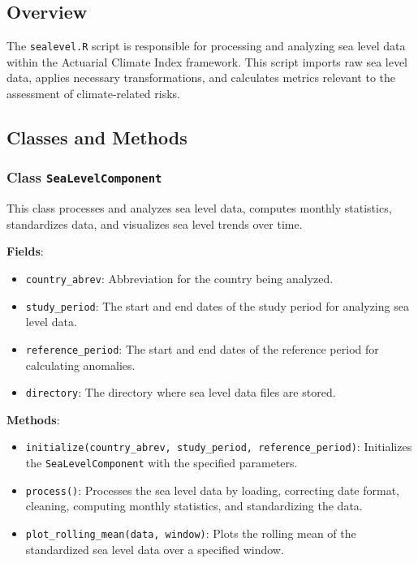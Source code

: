 \documentclass[a4paper,12pt]{article}
\begin{document}
\subsection{Overview}
The \texttt{sealevel.R} script is responsible for processing and analyzing sea level data within the Actuarial Climate Index framework. This script imports raw sea level data, applies necessary transformations, and calculates metrics relevant to the assessment of climate-related risks.

\subsection{Classes and Methods}

\subsubsection{Class \texttt{SeaLevelComponent}}
This class processes and analyzes sea level data, computes monthly statistics, standardizes data, and visualizes sea level trends over time.

\textbf{Fields}:
\begin{itemize}
    \item \texttt{country\_abrev}: Abbreviation for the country being analyzed.
    \item \texttt{study\_period}: The start and end dates of the study period for analyzing sea level data.
    \item \texttt{reference\_period}: The start and end dates of the reference period for calculating anomalies.
    \item \texttt{directory}: The directory where sea level data files are stored.
\end{itemize}

\textbf{Methods}:

\begin{itemize}
    \item \texttt{initialize(country\_abrev, study\_period, reference\_period)}:
        Initializes the \texttt{SeaLevelComponent} with the specified parameters.
    \item \texttt{process()}:
        Processes the sea level data by loading, correcting date format, cleaning, computing monthly statistics, and standardizing the data.
    \item \texttt{plot\_rolling\_mean(data, window)}:
        Plots the rolling mean of the standardized sea level data over a specified window.
\end{itemize}
\end{document}
